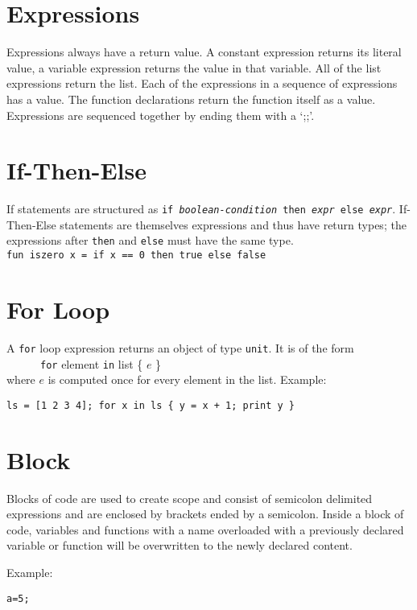\documentclass[12pt]{report}
\begin{document}
\section{Expressions}

Expressions always have a return value.  A constant expression returns its literal value, a variable expression returns the value in that variable.  All of the list expressions return the list.  Each of the expressions in a sequence of expressions has a value. The function declarations return the function itself as a value.
Expressions are sequenced together by ending them with a `;;'.


\section{If-Then-Else}

If statements are structured as \texttt{if \emph{boolean-condition} then \emph{expr} else \emph{expr}}. If-Then-Else statements are themselves expressions and thus have return types; the expressions after \texttt{then} and \texttt{else} must have the same type.\\
\texttt{fun iszero x = if x == 0 then true else false}

\section{For Loop}

A \texttt{for} loop expression returns an object of type \texttt{unit}.  It is of the form \\
\-\ \ \ \ \ \  \texttt{for} element \texttt{in} list \{ $e$ \} \\
where $e$ is computed once for every element in the list.
Example:

\texttt{ls = [1 2 3 4]; for x in ls \{ y = x + 1; print y \}}

\section{Block}

Blocks of code are used to create scope and consist of semicolon delimited expressions and are enclosed by brackets ended by a semicolon. Inside a block of code, variables and functions with a name overloaded with a previously declared variable or function will be overwritten to the newly declared content. 

Example:

\texttt{a=5;}
\end{document}
